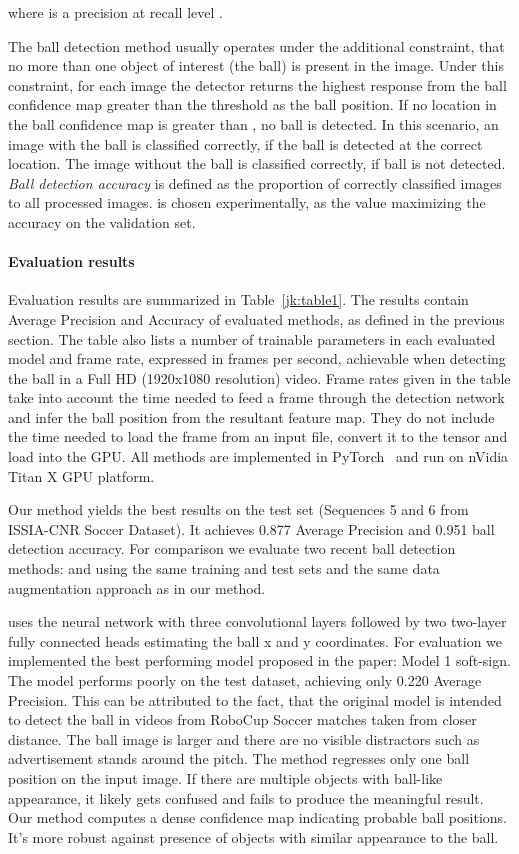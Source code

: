 \documentclass[a4paper,twoside]{article}
\begin{document}
 
where  is a precision at recall level .

The ball detection method usually operates under the additional constraint, that no more than one object of interest (the ball) is present in the image. Under this constraint, for each image the detector returns the highest response from the ball confidence map greater than the threshold  as the ball position. If no location in the ball confidence map is greater than , no ball is detected. In this scenario, an image with the ball is classified correctly, if the ball is detected at the correct location. The image without the ball is classified correctly, if ball is not detected. \emph{Ball detection accuracy} is defined as the proportion of correctly classified images to all processed images.  is chosen experimentally, as the value maximizing the accuracy on the validation set.

\paragraph{Evaluation results}
\label{jk:ev_results}
Evaluation results are summarized in Table~\ref{jk:table1}. The results contain Average Precision and Accuracy of evaluated methods, as defined in the previous section. 
The table also lists a number of trainable parameters in each evaluated model and frame rate, expressed in frames per second, achievable when detecting the ball in a Full HD (1920x1080 resolution) video.
Frame rates given in the table take into account the time needed to feed a frame through the detection network and infer the ball position from the resultant feature map. 
They do not include the time needed to load the frame from an input file, convert it to the tensor and load into the GPU. All methods are implemented in PyTorch~\cite{Pasz17} and run on nVidia Titan X GPU platform.

Our method yields the best results on the test set (Sequences 5 and 6 from ISSIA-CNR Soccer Dataset). It achieves 0.877 Average Precision and 0.951 ball detection accuracy. 
For comparison we evaluate two recent ball detection methods: \cite{Spec17} and \cite{Reno18} using the same training and test sets and the same data augmentation approach as in our method. 

\cite{Spec17} uses the neural network with three convolutional layers followed by two two-layer fully connected heads estimating the ball x and y coordinates. 
For evaluation we implemented the best performing model proposed in the paper: Model 1 soft-sign. The model performs poorly on the test dataset, achieving only 0.220 Average Precision. 
This can be attributed to the fact, that the original model is intended to detect the ball in videos from RoboCup Soccer matches taken from closer distance. The ball image is larger and there are no visible distractors such as advertisement stands around the pitch.
The method regresses only one ball position on the input image. If there are multiple objects with ball-like appearance, it likely gets confused and fails to produce the meaningful result.
Our method computes a dense confidence map indicating probable ball positions.
It's more robust against presence of objects with similar appearance to the ball.
\end{document}
